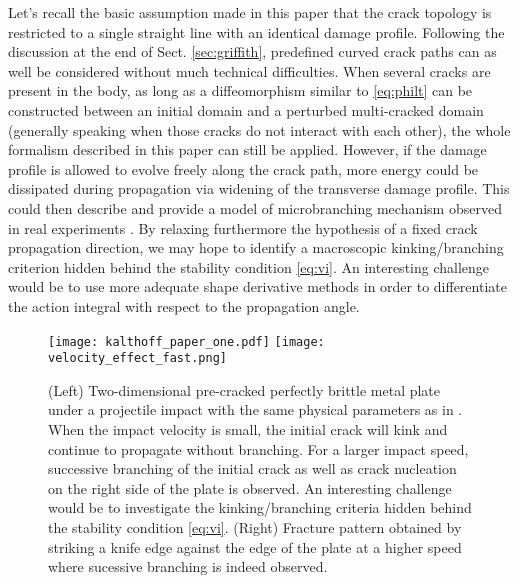 Let's recall the basic assumption made in this paper that the crack topology is restricted to a single straight line with an identical damage profile. Following the discussion at the end of Sect. \ref{sec:griffith}, predefined curved crack paths can as well be considered without much technical difficulties. When several cracks are present in the body, as long as a diffeomorphism similar to \eqref{eq:philt} can be constructed between an initial domain and a perturbed multi-cracked domain (generally speaking when those cracks do not interact with each other), the whole formalism described in this paper can still be applied. However, if the damage profile is allowed to evolve freely along the crack path, more energy could be dissipated during propagation via widening of the transverse damage profile. This could then describe and provide a model of microbranching mechanism observed in real experiments \cite{BouchbinderGoldmanFineberg:2014}. By relaxing furthermore the hypothesis of a fixed crack propagation direction, we may hope to identify a macroscopic kinking/branching criterion hidden behind the stability condition \eqref{eq:vi}. An interesting challenge would be to use more adequate shape derivative methods \cite{Hintermuller:2011} in order to differentiate the action integral with respect to the propagation angle.
\begin{figure}[htbp]
\centering
\texttt{[image: kalthoff\_paper\_one.pdf]} \hspace{0.2cm}
\texttt{[image: velocity\_effect\_fast.png]}
\caption{(Left) Two-dimensional pre-cracked perfectly brittle metal plate under a projectile impact with the same physical parameters as in \cite{SongWangBelytschko:2008}. When the impact velocity is small, the initial crack will kink and continue to propagate without branching. For a larger impact speed, successive branching of the initial crack as well as crack nucleation on the right side of the plate is observed. An interesting challenge would be to investigate the kinking/branching criteria hidden behind the stability condition \eqref{eq:vi}. (Right) Fracture pattern obtained by striking a knife edge against the edge of the plate at a higher speed \cite{Schardin:2012} where sucessive branching is indeed observed.}
\end{figure}
